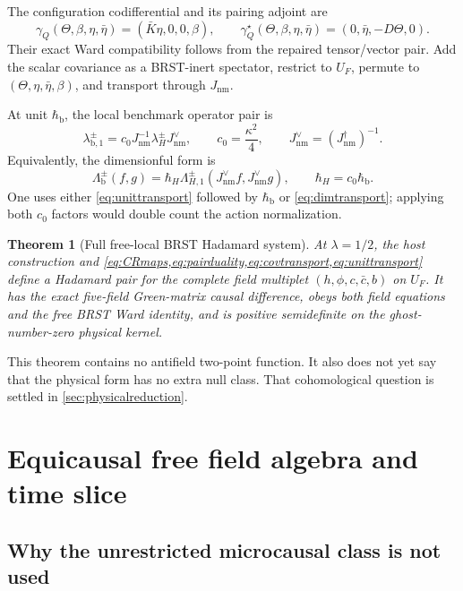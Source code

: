 \documentclass[11pt]{article}
\newtheorem{theorem}{Theorem}[section]
\theoremstyle{definition}
\theoremstyle{remark}
\newcommand{\U}{U_{F}}
\newcommand{\cbar}{\bar c}
\newcommand{\hbarLB}{\hbar_{\mathrm{b}}}
\begin{document}
The configuration codifferential and its pairing adjoint are
\begin{equation}
 \gamma_Q(\Theta,\beta,\eta,\bar\eta)
 =(\bar K\eta,0,0,\beta),
 \qquad
 \gamma_Q^\star(\Theta,\beta,\eta,\bar\eta)
 =(0,\bar\eta,-D\Theta,0).
 \label{eq:gammaQ}
\end{equation}
Their exact Ward compatibility follows from the repaired tensor/vector pair.  Add the
scalar covariance as a BRST-inert spectator, restrict to $\U$, permute to
$(\Theta,\eta,\bar\eta,\beta)$, and transport through $J_{\mathrm{nm}}$.

At unit $\hbarLB$, the local benchmark operator pair is
\begin{equation}
 \lambda_{\mathrm{b},1}^\pm
 =c_0J_{\mathrm{nm}}^{-1}\lambda_H^\pm J_{\mathrm{nm}}^\vee,
 \qquad c_0=\frac{\kappa^2}{4},
 \qquad J_{\mathrm{nm}}^\vee=(J_{\mathrm{nm}}^\dagger)^{-1}.
 \label{eq:unittransport}
\end{equation}
Equivalently, the dimensionful form is
\begin{equation}
 \Lambda_{\mathrm{b}}^\pm(f,g)=
 \hbar_H\Lambda_{H,1}^\pm(J_{\mathrm{nm}}^\vee f,J_{\mathrm{nm}}^\vee g),
 \qquad \hbar_H=c_0\hbarLB.
 \label{eq:dimtransport}
\end{equation}
One uses either \cref{eq:unittransport} followed by $\hbarLB$ or
\cref{eq:dimtransport}; applying both $c_0$ factors would double count the action
normalization.

\begin{theorem}[Full free-local BRST Hadamard system]
At $\lambda=1/2$, the host construction and
\cref{eq:CRmaps,eq:pairduality,eq:covtransport,eq:unittransport} define a
Hadamard pair for the complete field multiplet $(h,\phi,c,\cbar,b)$ on $\U$.  It has
the exact five-field Green-matrix causal difference, obeys both field equations and the
free BRST Ward identity, and is positive semidefinite on the ghost-number-zero
physical kernel.
\end{theorem}

This theorem contains no antifield two-point function.  It also does not yet say that
the physical form has no extra null class.  That cohomological question is settled in
\cref{sec:physicalreduction}.

\section{Equicausal free field algebra and time slice}

\subsection{Why the unrestricted microcausal class is not used}
\end{document}
